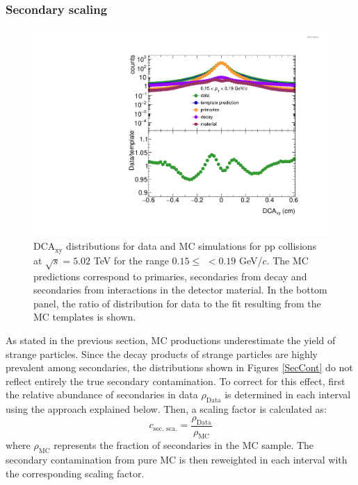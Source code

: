 \documentclass[12pt,a4paper]{report}
\begin{document}
\subsubsection{Secondary scaling}
\begin{figure}[tb!]
\centering
\includegraphics[width=12cm]{Plots/DCAdistributions.pdf}  
\caption{DCA$_\text{xy}$ distributions for data and MC simulations for pp collisions at $\sqrt{s} = 5.02$ TeV for the \pt range $0.15 \leq $ \pt $< 0.19$ GeV/$c$. The MC predictions correspond to primaries, secondaries from decay and secondaries from interactions in the detector material. In the bottom panel, the ratio of distribution for data to the fit resulting from the MC templates is shown.}
\label{secScaling}
\end{figure}
As stated in the previous section, MC productions underestimate the yield of strange particles. Since the decay products of strange particles are highly prevalent among secondaries, the distributions shown in Figures \ref{SecCont} do not reflect entirely the true secondary contamination. To correct for this effect, first the relative abundance of secondaries in data $\rho_\text{Data}$ is determined in each \pt interval using the approach explained below. Then, a scaling factor is calculated as:
\begin{equation}
c_\text{sec. sca.} = \dfrac{\rho_\text{Data}}{\rho_\text{MC}}
\end{equation}
where $\rho_\text{MC}$ represents the fraction of secondaries in the MC sample. The secondary contamination from pure MC is then reweighted in each \pt interval with the corresponding scaling factor.\\
\end{document}
